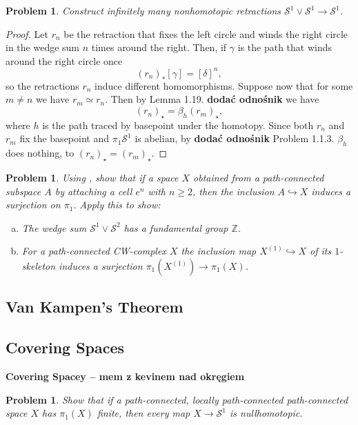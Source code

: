 \documentclass[11pt, a4paper, final]{amsart}
\newcommand{\Z}{{\mathbb{Z}}}
\newcommand\todo[1]{\textbf{\textcolor{redd}{#1}}}
\newcommand{\sphere}{\mathcal{S}}
\numberwithin{theorem}{section}
\newtheorem{problem}[theorem]{Problem}
\theoremstyle{definition}
\theoremstyle{remark}
\begin{document}
\begin{problem}\label{problem: 1.1.17}
    Construct infinitely many nonhomotopic retractions $\sphere^1 \vee\sphere^1 \rightarrow \sphere^1$.
\end{problem}
\begin{proof}
    Let \( r_n \) be the retraction that fixes the left circle and winds the right circle in the wedge sum \( n \) times around the right. Then, if \( \gamma \) is the path that winds around the right circle once
\[ 
    (r_n)_*[\gamma] = [\delta]^n, 
\]
so the retractions \( r_n \) induce different homomorphisms. Suppose now that for some \( m \neq n \) we have \( r_m \simeq r_n \). Then by Lemma 1.19. \todo{dodać odnośnik} we have
\[ 
    (r_n)_\star = \beta_h (r_m)_\star,
\]
where \( h \) is the path traced by basepoint under the homotopy. Since both \( r_n \) and \( r_m \) fix the basepoint and \( \pi_1\sphere^1 \) is abelian, by \todo{dodać odnośnik} Problem 1.1.3. \( \beta_h \) does nothing, to \( (r_n)_\star = (r_m)_\star \).

\end{proof}
\begin{problem}\label{problem: 1.1.18}
    Using \cite[Lemma 1.15]{AH}, show that if a space $X$ obtained from a path-connected subspace $A$ by attaching a cell $e^n$ with $n \geq 2$, then the inclusion $A \hookrightarrow X$ induces a surjection on $\pi_1$. Apply this to show:
    \begin{enumerate}[(a)]
        \item The wedge sum $\sphere^1 \vee\sphere^2$ has a fundamental group $\Z$.
        \item For a path-connected CW-complex $X$ the inclusion map $X^{(1)} \hookrightarrow X$ of its $1$-skeleton induces a surjection $\pi_1(X^{(1)}) \rightarrow \pi_1(X)$.
    \end{enumerate}
\end{problem}

\subsection{Van Kampen's Theorem}
\subsection{Covering Spaces} \todo{Covering Spacey -- mem z kevinem nad okręgiem}

\begin{problem}\label{problem: 1.3.9.}
    Show that if a path-connected, locally path-connected path-connected space \( X \) has \( \pi_1(X) \) finite, then every map \( X \to \sphere^1 \) is nullhomotopic.
\end{problem}
\end{document}
